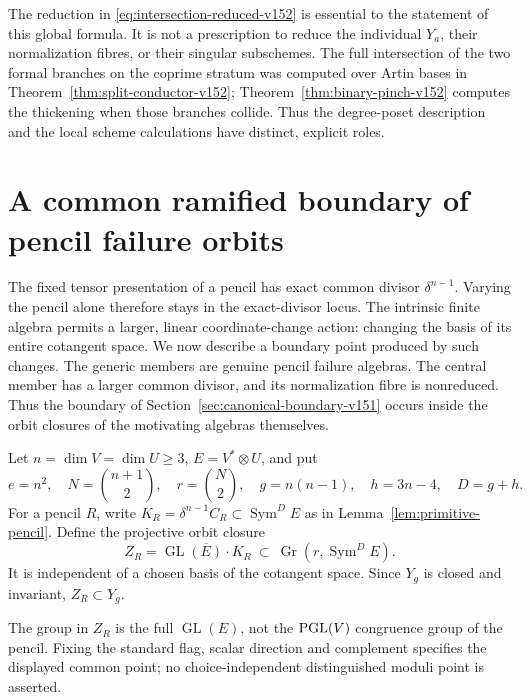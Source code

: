 \documentclass[11pt,reqno]{amsart}
\numberwithin{equation}{section}
\theoremstyle{definition}\newtheorem{definition}[theorem]{Definition}
\theoremstyle{remark}\newtheorem{remark}[theorem]{Remark}
\DeclareMathOperator{\Sym}{Sym}\DeclareMathOperator{\Gr}{Gr}
\begin{document}
The reduction in \eqref{eq:intersection-reduced-v152} is essential
to the statement of this global formula.  It is not a prescription
to reduce the individual $Y_a$, their normalization fibres, or their
singular subschemes.  The full intersection of the two formal
branches on the coprime stratum was computed over Artin bases in
Theorem~\ref{thm:split-conductor-v152};
Theorem~\ref{thm:binary-pinch-v152} computes the thickening when
those branches collide.  Thus the degree-poset description and
the local scheme calculations have distinct, explicit roles.

\section{A common ramified boundary of pencil failure orbits}
\label{sec:orbit-boundary-v152}

The fixed tensor presentation of a pencil has exact common divisor
$\delta^{n-1}$.  Varying the pencil alone therefore stays in the
exact-divisor locus.  The intrinsic finite algebra permits a larger,
linear coordinate-change action: changing the basis of its entire cotangent
space.  We now describe a boundary point produced by such changes.
The generic members are genuine pencil failure algebras.  The central
member has a larger common divisor, and its normalization fibre is
nonreduced.  Thus the boundary of Section~\ref{sec:canonical-boundary-v151}
occurs inside the orbit closures of the motivating algebras themselves.

Let $n=\dim V=\dim U\geq3$, $E=V^*\otimes U$, and put
\[
 e=n^2,\quad N=\binom{n+1}{2},\quad r=\binom N2,\quad
 g=n(n-1),\quad h=3n-4,\quad D=g+h.
\]
For a pencil $R$, write $K_R=\delta^{n-1}C_R\subset\Sym^D E$
as in Lemma~\ref{lem:primitive-pencil}.  Define the projective orbit
closure
\[
 Z_R=\overline{\operatorname{GL}(E)\cdot K_R}
                  \ \subset\ \Gr(r,\Sym^D E).
\]
It is independent of a chosen basis of the cotangent space.  Since
$Y_g$ is closed and invariant, $Z_R\subset Y_g$.

The group in $Z_R$ is the full $\operatorname{GL}(E)$, not the
$\operatorname{PGL}(V)$ congruence group of the pencil. Fixing the standard flag,
scalar direction and complement specifies the displayed common point;
no choice-independent distinguished moduli point is asserted.
\end{document}
